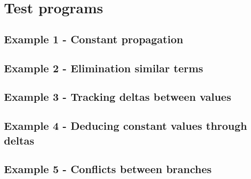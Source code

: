 \newpage
\clearpage
\section*{Test programs}
\subsection*{Example 1 - Constant propagation}
\newpage
\clearpage
\subsection*{Example 2 - Elimination similar terms}
\newpage
\clearpage
\subsection*{Example 3 - Tracking deltas between values}
\newpage
\clearpage
\subsection*{Example 4 - Deducing constant values through deltas}
\newpage
\clearpage
\subsection*{Example 5 - Conflicts between branches}
